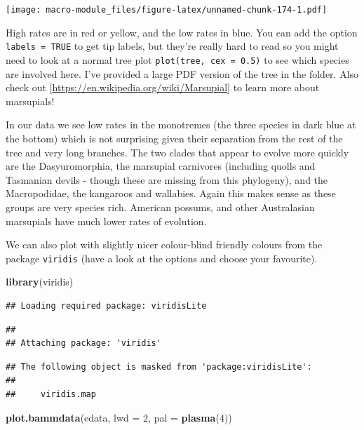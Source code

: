 \documentclass[]{book}
\newenvironment{Shaded}{\begin{snugshade}}{\end{snugshade}}
\newcommand{\KeywordTok}[1]{\textcolor[rgb]{0.13,0.29,0.53}{\textbf{{#1}}}}
\newcommand{\DataTypeTok}[1]{\textcolor[rgb]{0.13,0.29,0.53}{{#1}}}
\newcommand{\DecValTok}[1]{\textcolor[rgb]{0.00,0.00,0.81}{{#1}}}
\newcommand{\NormalTok}[1]{{#1}}
\theoremstyle{definition}
\theoremstyle{definition}
\theoremstyle{definition}
\theoremstyle{remark}
\begin{document}
\texttt{[image: macro-module\_files/figure-latex/unnamed-chunk-174-1.pdf]}

High rates are in red or yellow, and the low rates in blue. You can add
the option \texttt{labels\ =\ TRUE} to get tip labels, but they're
really hard to read so you might need to look at a normal tree plot
\texttt{plot(tree,\ cex\ =\ 0.5)} to see which species are involved
here. I've provided a large PDF version of the tree in the folder. Also
check out {[}\url{https://en.wikipedia.org/wiki/Marsupial}{]} to learn
more about marsupials!

In our data we see low rates in the monotremes (the three species in
dark blue at the bottom) which is not surprising given their separation
from the rest of the tree and very long branches. The two clades that
appear to evolve more quickly are the Dasyuromorphia, the marsupial
carnivores (including quolls and Tasmanian devils - though these are
missing from this phylogeny), and the Macropodidae, the kangaroos and
wallabies. Again this makes sense as these groups are very species rich.
American possums, and other Australasian marsupials have much lower
rates of evolution.

We can also plot with slightly nicer colour-blind friendly colours from
the package \texttt{viridis} (have a look at the options and choose your
favourite).

\begin{Shaded}
\begin{Highlighting}[]
\KeywordTok{library}\NormalTok{(viridis)}
\end{Highlighting}
\end{Shaded}

\begin{verbatim}
## Loading required package: viridisLite
\end{verbatim}

\begin{verbatim}
## 
## Attaching package: 'viridis'
\end{verbatim}

\begin{verbatim}
## The following object is masked from 'package:viridisLite':
## 
##     viridis.map
\end{verbatim}

\begin{Shaded}
\begin{Highlighting}[]
\KeywordTok{plot.bammdata}\NormalTok{(edata, }\DataTypeTok{lwd =} \DecValTok{2}\NormalTok{, }\DataTypeTok{pal =} \KeywordTok{plasma}\NormalTok{(}\DecValTok{4}\NormalTok{))}
\end{Highlighting}
\end{Shaded}
\end{document}
